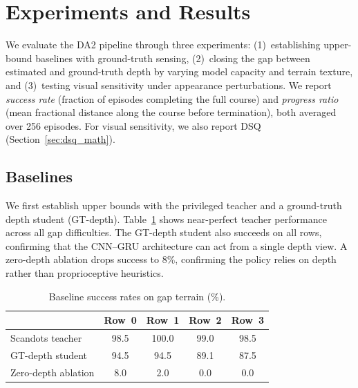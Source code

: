 \section{Experiments and Results}
\label{sec:experiments}

We evaluate the DA2 pipeline through three experiments:
(1)~establishing upper-bound baselines with ground-truth sensing,
(2)~closing the gap between estimated and ground-truth depth by
varying model capacity and terrain texture, and
(3)~testing visual sensitivity under appearance perturbations.
We report \emph{success rate} (fraction of episodes completing the
full course) and \emph{progress ratio} (mean fractional distance
along the course before termination), both averaged over 256
episodes.  For visual sensitivity, we also report DSQ
(Section~\ref{sec:dsq_math}).

\subsection{Baselines}
\label{sec:baselines}

We first establish upper bounds with the privileged teacher and
a ground-truth depth student (GT-depth).
Table~\ref{tab:baselines} shows near-perfect teacher performance
across all gap difficulties.
The GT-depth student also succeeds on all rows, confirming that the
CNN--GRU architecture can act from a single depth view.  A
zero-depth ablation drops success to 8\%, confirming the policy
relies on depth rather than proprioceptive heuristics.

\begin{table}[t]
	\centering
	\caption{Baseline success rates on gap terrain (\%).}
	\label{tab:baselines}
	\small
	\begin{tabular}{@{}lcccc@{}}
		\toprule
		                    & Row~0 & Row~1 & Row~2 & Row~3 \\
		\midrule
		Scandots teacher    & 98.5  & 100.0 & 99.0  & 98.5  \\
		GT-depth student    & 94.5  & 94.5  & 89.1  & 87.5  \\
		Zero-depth ablation & 8.0   & 2.0   & 0.0   & 0.0   \\
		\bottomrule
	\end{tabular}
\end{table}


